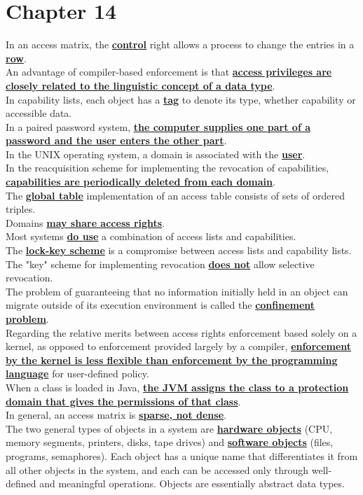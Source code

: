 \documentclass[10pt]{article}
\newcommand{\qw}[1]{\textbf{\ul{#1}}}
\begin{document}
\section*{\centering Chapter 14}
In an access matrix, the \qw{control} right allows a process to change the entries in a \qw{row}.\\[2mm]
An advantage of compiler-based enforcement is that \qw{access privileges are closely related to the linguistic concept of a data type}.\\[2mm]
In capability lists, each object has a \qw{tag} to denote its type, whether capability or accessible data.\\[2mm]
In a paired password system, \qw{the computer supplies one part of a password and the user enters the other part}.\\[2mm]
In the UNIX operating system, a domain is associated with the \qw{user}.\\[2mm]
In the reacquisition scheme for implementing the revocation of capabilities, \qw{capabilities are periodically deleted from each domain}.\\[2mm]
The \qw{global table} implementation of an access table consists of sets of ordered triples.\\[2mm]
Domains \qw{may share access rights}.\\[2mm]
Most systems \qw{do use} a combination of access lists and capabilities.\\[2mm]
The \qw{lock-key scheme} is a compromise between access lists and capability lists.\\[2mm]
The "key" scheme for implementing revocation \qw{does not} allow selective revocation.\\[2mm]
The problem of guaranteeing that no information initially held in an object can migrate outside of its execution environment is called the \qw{confinement problem}.\\[2mm]
Regarding the relative merits between access rights enforcement based solely on a kernel, as opposed to enforcement provided largely by a compiler, \qw{enforcement by the kernel is less flexible than enforcement by the programming language} for user-defined policy.\\[2mm]
When a class is loaded in Java, \qw{the JVM assigns the class to a protection domain that gives the permissions of that class}.\\[2mm]
In general, an access matrix is \qw{sparse, not dense}.\\[2mm]
The two general types of objects in a system are \qw{hardware objects} (CPU, memory segments, printers, disks, tape drives) and \qw{software objects} (files, programs, semaphores). Each object has a unique name that differentiates it from all other objects in the system, and each can be accessed only through well-defined and meaningful operations. Objects are essentially abstract data types.\\[2mm]
\end{document}
